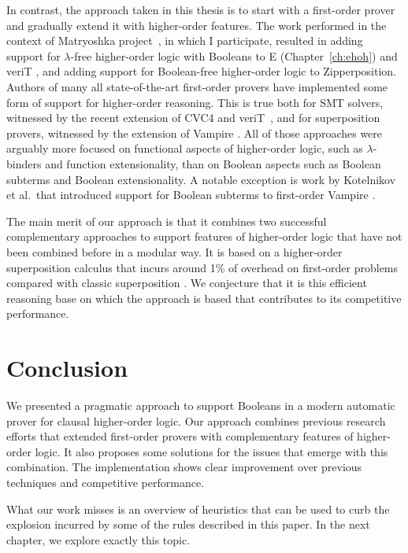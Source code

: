 In contrast, the approach taken in this thesis is to start with a first-order prover and gradually extend it
with higher-order features. The work performed in the context of Matryoshka project~\cite{matryoshka}, 
in which I participate, resulted in adding support for
$\lambda$-free higher-order logic with Booleans to E (Chapter~\ref{ch:ehoh})
and veriT \cite{cbetal-11-cvc4}, and adding support for Boolean-free higher-order
logic to Zipperposition. Authors of many all state-of-the-art
first-order provers have implemented some form of support for higher-order reasoning. This
is true both for SMT solvers, witnessed by the recent extension of CVC4 and veriT~\cite{cbetal-11-cvc4},
 and for superposition provers, witnessed
by the extension of Vampire \cite{br-19-restricted-unif}. All of those approaches were
arguably more focused on functional aspects of higher-order logic, such as
$\lambda$-binders and function extensionality, than on Boolean aspects such as
Boolean subterms and Boolean extensionality. A notable exception is work by
Kotelnikov et al.\ that introduced support for Boolean subterms to first-order
Vampire \cite{kotelnikov-15-fool,kotelnikov-16-fool}.

The main merit of our approach is that it combines two successful complementary
approaches to support features of higher-order logic that have not been combined
before in a modular way. It is based on a higher-order superposition calculus
that incurs around 1\% of overhead on first-order problems compared with classic
superposition \cite{bbtvw-21-sup-lam}. We conjecture that it is
this efficient reasoning base on which the approach is based that contributes to
its competitive performance.

\section{Conclusion} 
\label{sect:bool:conclusion}

We presented a pragmatic approach to support Booleans in a modern automatic prover
for clausal higher-order logic. Our approach combines
previous research efforts that extended first-order provers with complementary
features of higher-order logic. It also proposes some solutions for the issues that
emerge with this combination. The implementation shows clear improvement over previous
techniques and competitive performance.

What our work misses is an overview of heuristics that can be used to curb the
explosion incurred by some of the rules described in this paper. In the next chapter,
we explore exactly this topic.




